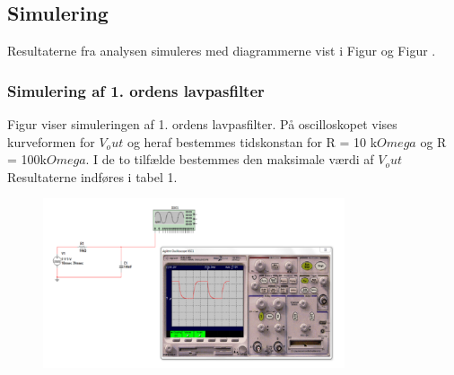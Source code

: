
\subsection{Simulering}
Resultaterne fra analysen simuleres med diagrammerne vist i Figur  og Figur . 

\subsubsection{Simulering af 1. ordens lavpasfilter}
Figur viser simuleringen af 1. ordens lavpasfilter. På oscilloskopet vises kurveformen for $V_out$ og heraf bestemmes tidskonstan for R = 10 k$Omega$ og R = 100k$Omega$.
I de to tilfælde bestemmes den maksimale værdi af $V_out$
Resultaterne indføres i tabel 1.

\begin{figure}[h]
 \begin{center}
  \includegraphics[height=5cm]{P_Figur/1.orden}
  \caption{}
  \label{fig:}
 \end{center}
\end{figure}